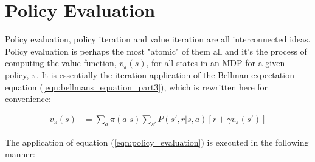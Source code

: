 \documentclass[a4paper,11pt]{article}
\begin{document}
\section{Policy Evaluation}

Policy evaluation, policy iteration and value iteration are all interconnected ideas.  Policy evaluation is perhaps the most "atomic" of them all and it's the process of computing the value function, $v_{\pi}(s)$, for all states in an MDP for a given policy, $\pi$.  It is essentially the iteration application of the Bellman expectation equation (\ref{eqn:bellmans_equation_part3}), which is rewritten here for convenience:

\begin{equation} \label{eqn:policy_evaluation}
    \begin{split}
        v_\pi (s) &= \sum_{a} \pi(a|s) \sum_{s'} P(s',r|s,a) [r + \gamma v_{\pi}(s')]
    \end{split}
\end{equation}

The application of equation (\ref{eqn:policy_evaluation}) is executed in the following manner:
\end{document}
